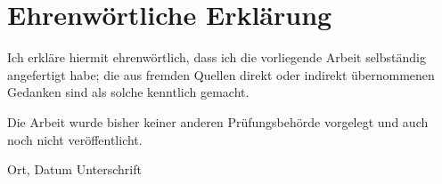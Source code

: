 \documentclass[12pt]{article}
\begin{document}
		
	\newpage
	\thispagestyle{empty}
	\clearpage
	
	\section*{Ehrenwörtliche Erklärung}
	
	Ich erkläre hiermit ehrenwörtlich, dass ich die vorliegende Arbeit selbständig angefertigt habe; die aus fremden Quellen direkt oder indirekt übernommenen Gedanken sind als solche kenntlich gemacht.
	\par \bigskip
	\noindent Die Arbeit wurde bisher keiner anderen Prüfungsbehörde vorgelegt und auch noch nicht veröffentlicht.
	
	\vspace{4cm}
	
	\hspace{2cm} Ort, Datum \hfill Unterschrift \hspace{2cm}
	\pagebreak
\end{document}

